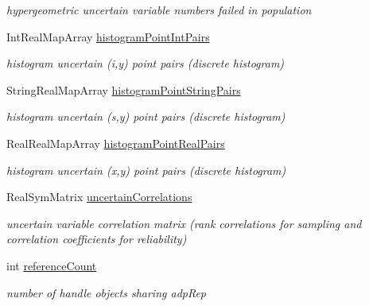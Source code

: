 \begin{DoxyCompactItemize}
\begin{DoxyCompactList}\small\item\em hypergeometric uncertain variable numbers failed in population \end{DoxyCompactList}\item 
Int\+Real\+Map\+Array \hyperlink{classPecos_1_1AleatoryDistParamsRep_a1bc8c4dfa6b5ccb9c6a286c962e16eb4}{histogram\+Point\+Int\+Pairs}\label{classPecos_1_1AleatoryDistParamsRep_a1bc8c4dfa6b5ccb9c6a286c962e16eb4}

\begin{DoxyCompactList}\small\item\em histogram uncertain (i,y) point pairs (discrete histogram) \end{DoxyCompactList}\item 
String\+Real\+Map\+Array \hyperlink{classPecos_1_1AleatoryDistParamsRep_af2e6cda793fc803c9a73b758df062259}{histogram\+Point\+String\+Pairs}\label{classPecos_1_1AleatoryDistParamsRep_af2e6cda793fc803c9a73b758df062259}

\begin{DoxyCompactList}\small\item\em histogram uncertain (s,y) point pairs (discrete histogram) \end{DoxyCompactList}\item 
Real\+Real\+Map\+Array \hyperlink{classPecos_1_1AleatoryDistParamsRep_a0725a5f24601a33701b4b9431cc4cad4}{histogram\+Point\+Real\+Pairs}\label{classPecos_1_1AleatoryDistParamsRep_a0725a5f24601a33701b4b9431cc4cad4}

\begin{DoxyCompactList}\small\item\em histogram uncertain (x,y) point pairs (discrete histogram) \end{DoxyCompactList}\item 
Real\+Sym\+Matrix \hyperlink{classPecos_1_1AleatoryDistParamsRep_aa93c8713a49ce698ba8f91008863d6d2}{uncertain\+Correlations}\label{classPecos_1_1AleatoryDistParamsRep_aa93c8713a49ce698ba8f91008863d6d2}

\begin{DoxyCompactList}\small\item\em uncertain variable correlation matrix (rank correlations for sampling and correlation coefficients for reliability) \end{DoxyCompactList}\item 
int \hyperlink{classPecos_1_1AleatoryDistParamsRep_afff0b6144883d3ca09a8d0d3f4776b0f}{reference\+Count}\label{classPecos_1_1AleatoryDistParamsRep_afff0b6144883d3ca09a8d0d3f4776b0f}

\begin{DoxyCompactList}\small\item\em number of handle objects sharing adp\+Rep \end{DoxyCompactList}\end{DoxyCompactItemize}
